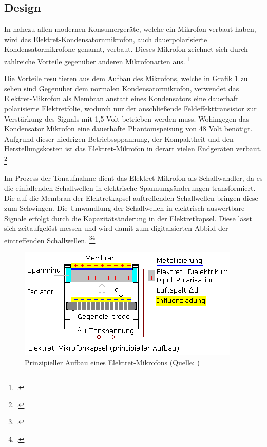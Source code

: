 \subsection{Design}
In nahezu allen modernen Konsumergeräte, welche ein Mikrofon verbaut haben, wird das Elektret-Kondensatornmikrofon, auch dauerpolarisierte Kondensatormikrofone genannt, verbaut.
Dieses Mikrofon zeichnet sich durch zahlreiche Vorteile gegenüber anderen Mikrofonarten aus.
\footcite[vlg.:][]{micNutzung}

Die Vorteile resultieren aus dem Aufbau des Mikrofons, welche in Grafik \ref{figElektretMic} zu sehen sind Gegenüber dem normalen Kondensatormikrofon, verwendet das Elektret-Mikrofon als Membran anstatt eines Kondensators eine dauerhaft polarisierte Elektretfolie, wodurch nur der anschließende Feldeffekttransistor zur Verstärkung des Signals mit 1,5 Volt betrieben werden muss. Wohingegen das Kondensator Mikrofon eine dauerhafte Phantomspeisung von 48 Volt benötigt. Aufgrund dieser niedrigen Betriebssppannung, der Kompaktheit und den Herstellungskosten ist das Elektret-Mikrofon in derart vielen Endgeräten verbaut.
\footcite[vlg.:][S. 45 f.]{microphoneBook}

Im Prozess der Tonaufnahme dient das Elektret-Mikrofon als Schallwandler, da es die einfallenden Schallwellen in elektrische Spannungsänderungen transformiert. Die auf die Membran der Elektretkapsel auftreffenden Schallwellen bringen diese zum Schwingen. Die Umwandlung der Schallwellen in elektrisch auswertbare Signale erfolgt durch die Kapazitätsänderung in der Elektretkapsel. Diese lässt sich zeitaufgelöst messen und wird damit zum digitalsierten Abbild der eintreffenden Schallwellen.
\footcite[vlg.:][S. 45 f.]{microphoneBook}\footcite[vlg.:][]{funktionsweiseMic}

\begin{figure}[h]
	\centering
  \includegraphics[scale=0.75]{images/aufbau_mic.png}
	\caption{Prinzipieller Aufbau eines Elektret-Mikrofons (Quelle: \cite[][]{funktionsweiseMic})}
	\label{figElektretMic}
\end{figure}



